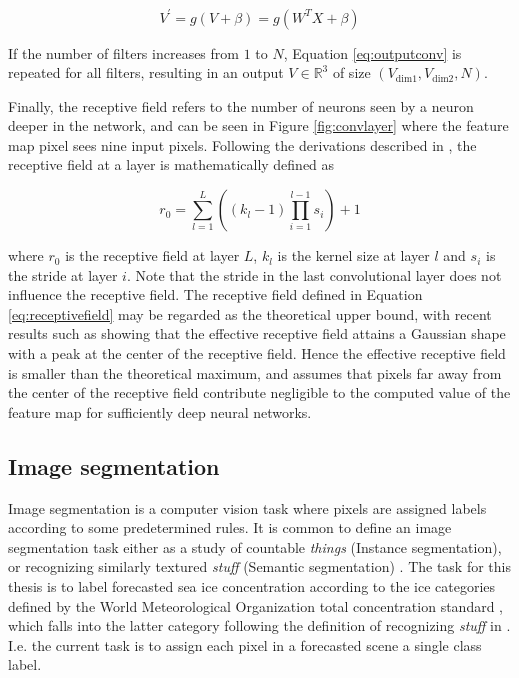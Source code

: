 \documentclass[../main/thesis.tex]{subfiles}
\begin{document}
\begin{equation}
    \label{eq:outputconv}
    V^\prime = g(V + \beta) = g(W^TX + \beta)
\end{equation}

If the number of filters increases from $1$ to $N$, Equation \ref{eq:outputconv} is repeated for all filters, resulting in an output $V \in{\mathbb{R}^3}$ of size $(V_\text{dim1}, V_\text{dim2}, N)$.

Finally, the receptive field refers to the number of neurons seen by a neuron deeper in the network, and can be seen in Figure \ref{fig:convlayer} where the feature map pixel sees nine input pixels. Following the derivations described in \citet{Araujo2019}, the receptive field at a layer is mathematically defined as

\begin{equation}
    \label{eq:receptivefield}
    r_0 = \sum_{l=1}^L\left(\left(k_l - 1\right)\prod_{i=1}^{l-1}s_i\right) + 1
\end{equation}

where $r_0$ is the receptive field at layer $L$, $k_l$ is the kernel size at layer $l$ and $s_i$ is the stride at layer $i$. Note that the stride in the last convolutional layer does not influence the receptive field. The receptive field defined in Equation \ref{eq:receptivefield} may be regarded as the theoretical upper bound, with recent results such as \citet{Luo2017} showing that the effective receptive field attains a Gaussian shape with a peak at the center of the receptive field. Hence the effective receptive field is smaller than the theoretical maximum, and assumes that pixels far away from the center of the receptive field contribute negligible to the computed value of the feature map for sufficiently deep neural networks.

\subsection{Image segmentation}
\label{sec:image-segmentation}
Image segmentation is a computer vision task where pixels are assigned labels according to some predetermined rules. It is common to define an image segmentation task either as a study of countable \textit{things} (Instance segmentation), or recognizing similarly textured \textit{stuff} (Semantic segmentation) \citep{Kirillov2018}. The task for this thesis is to label forecasted sea ice concentration according to the ice categories defined by the World Meteorological Organization total concentration standard \citep{WMO2014}, which falls into the latter category following the definition of recognizing \textit{stuff} in \citet{Adelson2001}. I.e. the current task is to assign each pixel in a forecasted scene a single class label.
\end{document}
